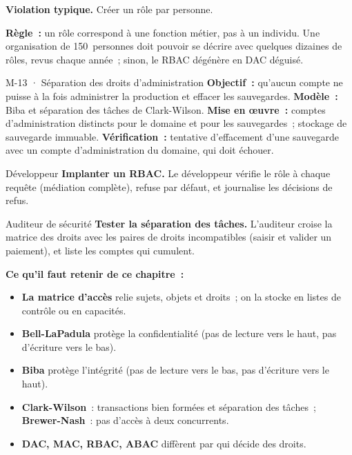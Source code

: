 \begin{boxalert}
\textbf{Violation typique.} Créer un rôle par personne.

\smallskip
\textbf{Règle~:} un rôle correspond à une fonction métier, pas à un
individu. Une organisation de 150~personnes doit pouvoir se décrire avec
quelques dizaines de rôles, revus chaque année~; sinon, le RBAC dégénère
en DAC déguisé.
\end{boxalert}

\begin{boxobjet}{M-13 · Séparation des droits d'administration}
\textbf{Objectif~:} qu'aucun compte ne puisse à la fois administrer la
production et effacer les sauvegardes. \textbf{Modèle~:} Biba et
séparation des tâches de Clark-Wilson. \textbf{Mise en œuvre~:} comptes
d'administration distincts pour le domaine et pour les sauvegardes~;
stockage de sauvegarde immuable. \textbf{Vérification~:} tentative
d'effacement d'une sauvegarde avec un compte d'administration du domaine,
qui doit échouer.
\end{boxobjet}

\begin{boxmetier}{Développeur}
\textbf{Implanter un RBAC.} Le développeur vérifie le rôle à chaque
requête (médiation complète), refuse par défaut, et journalise les
décisions de refus.
\end{boxmetier}

\begin{boxmetier}{Auditeur de sécurité}
\textbf{Tester la séparation des tâches.} L'auditeur croise la matrice
des droits avec les paires de droits incompatibles (saisir et valider un
paiement), et liste les comptes qui cumulent.
\end{boxmetier}

\separateur

\begin{boxresume}
\textbf{Ce qu'il faut retenir de ce chapitre~:}
\begin{itemize}
    \item \textbf{La matrice d'accès} relie sujets, objets et droits~; on
          la stocke en listes de contrôle ou en capacités.
    \item \textbf{Bell-LaPadula} protège la confidentialité (pas de lecture
          vers le haut, pas d'écriture vers le bas).
    \item \textbf{Biba} protège l'intégrité (pas de lecture vers le bas,
          pas d'écriture vers le haut).
    \item \textbf{Clark-Wilson}~: transactions bien formées et séparation
          des tâches~; \textbf{Brewer-Nash}~: pas d'accès à deux
          concurrents.
    \item \textbf{DAC, MAC, RBAC, ABAC} diffèrent par qui décide des droits.
\end{itemize}
\end{boxresume}

